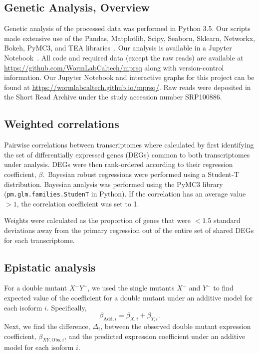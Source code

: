 \documentclass[9pt,twocolumn,twoside,lineno]{pnas-new}
\begin{document}
{\subsection*{Genetic Analysis, Overview}
Genetic analysis of the processed data was performed in Python 3.5. Our scripts
made extensive use of the Pandas, Matplotlib, Scipy, Seaborn, Sklearn, Networkx,
Bokeh, PyMC3, and TEA libraries~\cite{Team2014,McKinney2011,Oliphant2007,
Pedregosa2012,Salvatier2015,VanDerWalt2011,Hunter2007,Angeles-Albores2016,Waskom}.
Our analysis is available in a Jupyter Notebook~\cite{Perez2007}. All code and
required data (except the raw reads) are available at
\url{https://github.com/WormLabCaltech/mprsq} along with version-control
information. Our Jupyter Notebook and interactive graphs for this project can be
found at \url{https://wormlabcaltech.github.io/mprsq/}. Raw reads were deposited
in the Short Read Archive under the study accession number SRP100886.

\subsection*{Weighted correlations}
Pairwise correlations between transcriptomes where calculated by first identifying
the set of differentially expressed genes (DEGs) common to both transcriptomes
under analysis. DEGs were then rank-ordered according to their regression
coefficient, $\beta$.\ Bayesian robust regressions were performed using a
Student-T distribution. Bayesian analysis was performed using the PyMC3
library~\cite{Salvatier2015} (\texttt{pm.glm.families.StudenT} in Python). If
the correlation has an average value $>1$, the correlation coefficient was set
to 1.

Weights were calculated as the proportion of genes that were $<1.5$ standard
deviations away from the primary regression out of the entire set of shared DEGs
for each transcriptome.

\subsection*{Epistatic analysis}
For a double mutant $X^-Y^-$, we used the single mutants $X^-$ and $Y^-$ to find
expected value of the coefficient for a double mutant under an additive model for
each isoform $i$. Specifically,
\begin{equation}
  \beta_{\mathrm{Add},i} = \beta_{X,i} + \beta_{Y,i}.
\end{equation}
Next, we find the difference, $\Delta_i$, between the observed double mutant
expression coefficient, $\beta_{XY, \mathrm{Obs},i}$, and the predicted
expression coefficient under an additive model for each isoform $i$.

}
\end{document}
